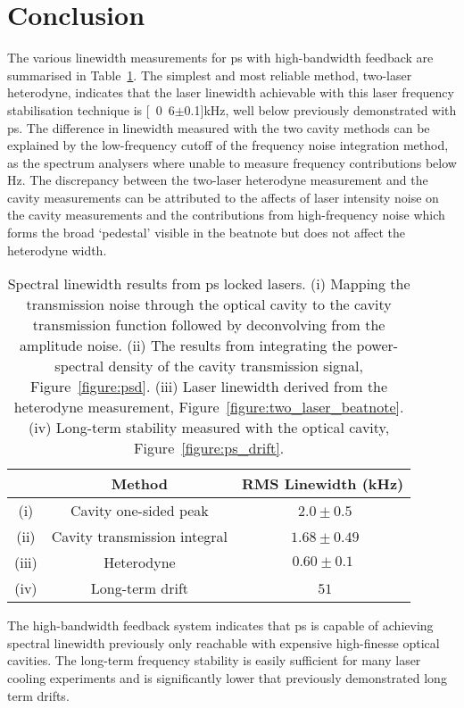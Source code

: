 \section{Conclusion}

The various linewidth measurements for \gls{ps} with high-bandwidth feedback are summarised in Table~\ref{table:linewidths}.
The simplest and most reliable method, two-laser heterodyne, indicates that the laser linewidth achievable with this laser frequency stabilisation technique is \unit[0.6$\pm$0.1]{kHz}, well below previously demonstrated with \gls{ps}.
The difference in linewidth measured with the two cavity methods can be explained by the low-frequency cutoff of the frequency noise integration method, as the spectrum analysers where unable to measure frequency contributions below \unit[24]{Hz}.
The discrepancy between the two-laser heterodyne measurement and the cavity measurements can be attributed to the affects of laser intensity noise on the cavity measurements and the contributions from high-frequency noise which forms the broad `pedestal' visible in the beatnote but does not affect the heterodyne width.

\begin{table}
\centering
\begin{tabular}{c c c}
\\
\hline
  & Method & RMS Linewidth (kHz) \\ \hline
  (i) & Cavity one-sided peak & \,\,$2.0 \pm 0.5$ \\
  (ii) & Cavity transmission integral & \,\,$1.68 \pm 0.49$ \\
  (iii) & Heterodyne & $0.60\pm0.1$ \\
  (iv) & Long-term drift & \,\,$51$ \\ \hline\end{tabular}

\caption{Spectral linewidth results from \gls{ps} locked lasers.
(i) Mapping the transmission noise through the optical cavity to the cavity transmission function followed by deconvolving from the amplitude noise.
(ii) The results from integrating the power-spectral density of the cavity transmission signal, Figure~\ref{figure:psd}.
(iii) Laser linewidth derived from the heterodyne measurement, Figure~\ref{figure:two_laser_beatnote}.
(iv) Long-term stability measured with the optical cavity, Figure~\ref{figure:ps_drift}.}
\label{table:linewidths}
\end{table}

The high-bandwidth feedback system indicates that \gls{ps} is capable of achieving spectral linewidth previously only reachable with expensive high-finesse optical cavities.
The long-term frequency stability is easily sufficient for many laser cooling experiments and is significantly lower that previously demonstrated long term drifts.

